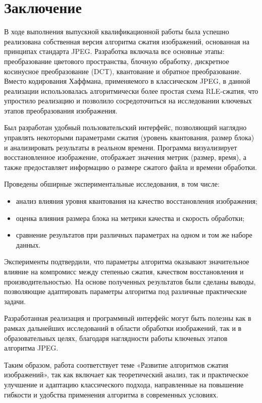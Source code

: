 \section*{Заключение}

В ходе выполнения выпускной квалификационной работы была успешно реализована собственная версия алгоритма 
сжатия изображений, основанная на принципах стандарта JPEG. 
Разработка включала все основные этапы: преобразование цветового пространства, 
блочную обработку, дискретное косинусное преобразование (DCT), квантование и обратное преобразование. 
Вместо кодирования Хаффмана, применяемого в классическом JPEG, 
в данной реализации использовалась алгоритмически более простая схема RLE-сжатия, 
что упростило реализацию и позволило сосредоточиться на исследовании ключевых этапов преобразования изображения.

Был разработан удобный пользовательский интерфейс, позволяющий наглядно управлять некоторыми параметрами 
сжатия (уровень квантования, размер блока) и анализировать результаты в реальном времени. 
Программа визуализирует восстановленное изображение, отображает значения метрик (размер, время), 
а также предоставляет информацию о размере сжатого файла и времени обработки.

Проведены обширные экспериментальные исследования, в том числе:

\begin{itemize}
    \item анализ влияния уровня квантования на качество восстановления изображения;
    \item оценка влияния размера блока на метрики качества и скорость обработки;
    \item сравнение результатов при различных параметрах на одном и том же наборе данных.
\end{itemize}

Эксперименты подтвердили, что параметры алгоритма оказывают значительное влияние 
на компромисс между степенью сжатия, качеством восстановления и производительностью. 
На основе полученных результатов были сделаны выводы, позволяющие адаптировать параметры алгоритма 
под различные практические задачи.

Разработанная реализация и программный интерфейс могут быть полезны как в рамках дальнейших исследований 
в области обработки изображений, так и в образовательных целях, 
благодаря наглядности работы ключевых этапов алгоритма JPEG.

Таким образом, работа соответствует теме «Развитие алгоритмов сжатия изображений», 
так как включает как теоретический анализ, так и практическое улучшение и адаптацию классического подхода, 
направленные на повышение гибкости и удобства применения алгоритма в современных условиях.